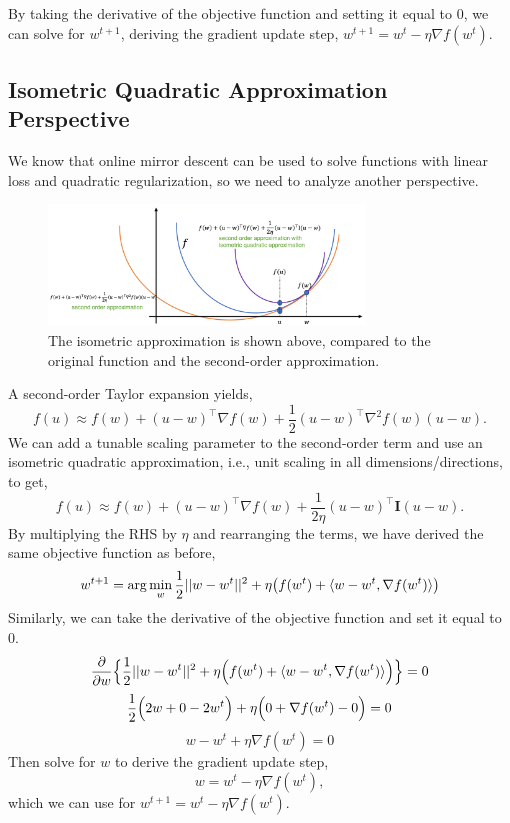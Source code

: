 \documentclass[11pt]{article}
\begin{document}
By taking the derivative of the objective function and setting it equal to 0, we can solve for $w^{t+1}$, deriving the gradient update step, $w^{t+1} = w^t - \eta \nabla f(w^t)$.

\subsection{Isometric Quadratic Approximation Perspective}
We know that online mirror descent can be used to solve functions with linear loss and quadratic regularization, so we need to analyze another perspective.
\begin{figure}[!h]
    \centering
    \includegraphics[width=0.75\textwidth]{isometric_gradient.png}
    \caption{The isometric approximation is shown above, compared to the original function and the second-order approximation.}
    \label{fig:isometric}
\end{figure}

A second-order Taylor expansion yields,
$$
    f(u) \approx f(w) + (u-w)^\intercal \nabla f(w) + \frac{1}{2}(u-w)^\intercal \nabla^2 f(w) (u-w).
$$
We can add a tunable scaling parameter to the second-order term and use an isometric quadratic approximation, i.e., unit scaling in all dimensions/directions, to get,
$$
    f(u) \approx f(w) + (u-w)^\intercal \nabla f(w) + \frac{1}{2\eta}(u-w)^\intercal \mathbf{I} (u-w).
$$
By multiplying the RHS by $\eta$ and rearranging the terms, we have derived the same objective function as before,
$$
w^{t+1} = \arg \min_w \frac{1}{2}||w-w^t||^2+\eta \big{(}f(w^t)+\langle w-w^t,\nabla f(w^t)\rangle\big{)}
$$
Similarly, we can take the derivative of the objective function and set it equal to 0. 
$$
\frac{\partial}{\partial w} \Big{\{} \frac{1}{2}||w-w^t||^2 + \eta \Big{(} f(w^t) +\langle w-w^t, \nabla f(w^t) \rangle \Big{)} \Big{\}} = 0
$$
$$
\frac{1}{2} \Big{(} 2w + 0 -2w^t\Big{)} + \eta \Big{(} 0 + \nabla f (w^t) - 0\Big{)} = 0
$$
$$
w - w^t + \eta \nabla f(w^t) = 0
$$
Then solve for $w$ to derive the gradient update step,
$$
w = w^t - \eta \nabla f(w^t),
$$
which we can use for $w^{t+1} = w^t - \eta \nabla f(w^t)$.
\end{document}
